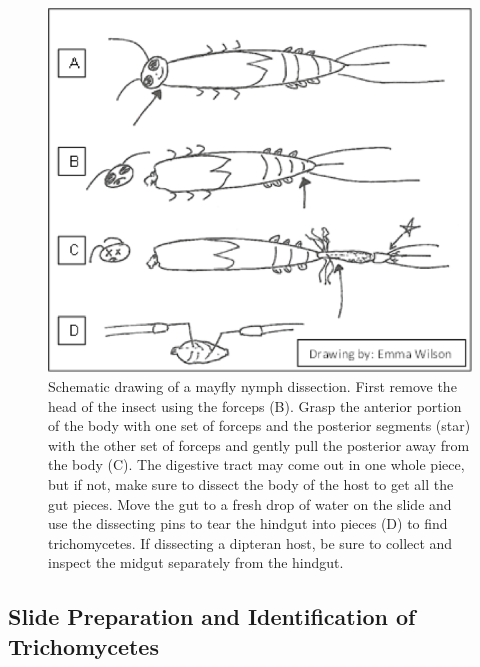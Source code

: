 \documentclass[]{book}
\begin{document}
\begin{figure}

{\centering \includegraphics[width=7.88in]{img/Ch4_Fig7} 

}

\caption{Schematic drawing of a mayfly nymph dissection.  First remove the head of the insect using the forceps (B).  Grasp the anterior portion of the body with one set of forceps and the posterior segments (star) with the other set of forceps and gently pull the posterior away from the body (C).  The digestive tract may come out in one whole piece, but if not, make sure to dissect the body of the host to get all the gut pieces.  Move the gut to a fresh drop of water on the slide and use the dissecting pins to tear the hindgut into pieces (D) to find trichomycetes.  If dissecting a dipteran host, be sure to collect and inspect the midgut separately from the hindgut.}\label{fig:ch4fig7}
\end{figure}

\hypertarget{slide-preparation-and-identification-of-trichomycetes}{%
\subsection{\texorpdfstring{\textbf{{Slide Preparation and Identification of Trichomycetes}}}{Slide Preparation and Identification of Trichomycetes}}\label{slide-preparation-and-identification-of-trichomycetes}}
\end{document}
